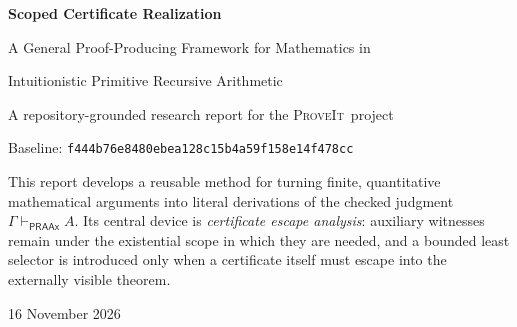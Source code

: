 \documentclass[11pt,oneside]{article}
\newcommand{\PRAAx}{\mathsf{PRAAx}}
\newcommand{\code}[1]{\texttt{#1}}
\newcommand{\repo}{\textsc{ProveIt}}
\newcommand{\turnstile}{\mathrel{\vdash_{\PRAAx}}}
\begin{document}
\hypersetup{pageanchor=false}
\begin{titlepage}
\centering
\vspace*{2.2cm}
{\Huge\bfseries\color{deepblue} Scoped Certificate Realization\par}
\vspace{0.35cm}
{\LARGE A General Proof-Producing Framework for Mathematics in\par}
\vspace{0.15cm}
{\LARGE Intuitionistic Primitive Recursive Arithmetic\par}
\vspace{1.25cm}
{\large A repository-grounded research report for the \repo\ project\par}
\vspace{0.5cm}
{\normalsize Baseline: \code{f444b76e8480ebea128c15b4a59f158e14f478cc}\par}
\vfill
\begin{minipage}{0.87\textwidth}
\small
This report develops a reusable method for turning finite, quantitative
mathematical arguments into literal derivations of the checked judgment
\(\Gamma\turnstile A\).  Its central device is \emph{certificate escape
analysis}: auxiliary witnesses remain under the existential scope in which
they are needed, and a bounded least selector is introduced only when a
certificate itself must escape into the externally visible theorem.
\end{minipage}
\vfill
{16 November 2026}
\end{titlepage}
\clearpage
\hypersetup{pageanchor=true}


\tableofcontents
\clearpage
{}

















\appendix



\end{document}
